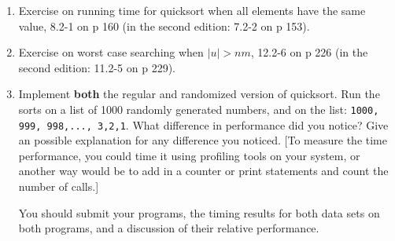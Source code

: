 \documentclass[11pt]{article}
\begin{document}
\begin{enumerate}
    \item Exercise on running time for quicksort when all elements have the
	same value,
	8.2-1 on p 160 (in the second edition: 7.2-2 on p 153).
    \item Exercise on worst case searching when $|u|>nm$,
	12.2-6 on p 226 (in the second edition: 11.2-5 on p 229).
    \item Implement {\bf  both} the regular and randomized version of
	quicksort.  Run the sorts on a list of 1000 randomly generated
	numbers, and on the list: {\tt 1000, 999, 998,..., 3,2,1}.
	What difference in performance did you notice?  Give an possible
	explanation for any difference you noticed.  
	[To measure 
	the time performance, you could time it using profiling tools
	on your system, or another way would be to add in a counter or
	print statements and count the number of calls.]

	You should submit your programs, the timing results for both
	data sets on both programs, and a discussion of their relative
	performance.

\end{enumerate}
\end{document}
